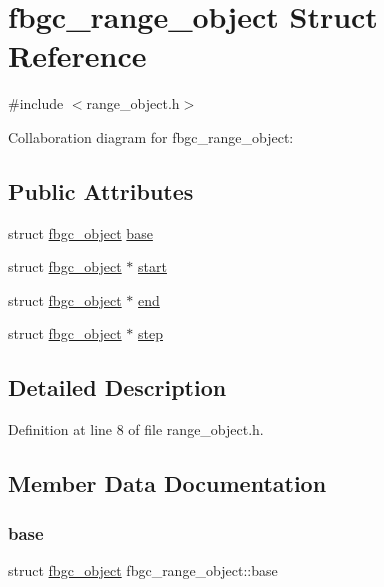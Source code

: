 \hypertarget{structfbgc__range__object}{}\section{fbgc\+\_\+range\+\_\+object Struct Reference}
\label{structfbgc__range__object}


{\ttfamily \#include $<$range\+\_\+object.\+h$>$}



Collaboration diagram for fbgc\+\_\+range\+\_\+object\+:
\subsection*{Public Attributes}
\begin{DoxyCompactItemize}
\item 
struct \hyperlink{structfbgc__object}{fbgc\+\_\+object} \hyperlink{structfbgc__range__object_a8a9ea4f0ae04663cbd749d09ce676970}{base}
\item 
struct \hyperlink{structfbgc__object}{fbgc\+\_\+object} $\ast$ \hyperlink{structfbgc__range__object_a0d496a131fc3701f21ba29bfb4213062}{start}
\item 
struct \hyperlink{structfbgc__object}{fbgc\+\_\+object} $\ast$ \hyperlink{structfbgc__range__object_a7fb7c65504b4209fea99ae2eeaae12ac}{end}
\item 
struct \hyperlink{structfbgc__object}{fbgc\+\_\+object} $\ast$ \hyperlink{structfbgc__range__object_a31d9d9edc8b0cf114d83dabb8daadd74}{step}
\end{DoxyCompactItemize}


\subsection{Detailed Description}


Definition at line 8 of file range\+\_\+object.\+h.



\subsection{Member Data Documentation}
\mbox{\label{structfbgc__range__object_a8a9ea4f0ae04663cbd749d09ce676970}} 
\subsubsection{\texorpdfstring{base}{base}}
{\footnotesize\ttfamily struct \hyperlink{structfbgc__object}{fbgc\+\_\+object} fbgc\+\_\+range\+\_\+object\+::base}




